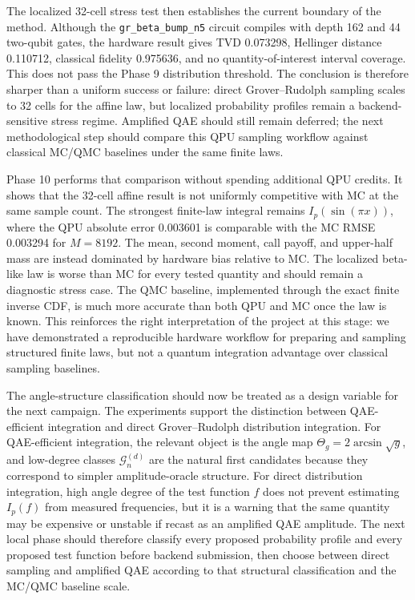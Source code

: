 The localized 32-cell stress test then establishes the current boundary of the
method. Although the \texttt{gr\_beta\_bump\_n5} circuit compiles with depth 162
and 44 two-qubit gates, the hardware result gives TVD 0.073298, Hellinger
distance 0.110712, classical fidelity 0.975636, and no quantity-of-interest
interval coverage. This does not pass the Phase 9 distribution threshold. The
conclusion is therefore sharper than a uniform success or failure: direct
Grover--Rudolph sampling scales to 32 cells for the affine law, but localized
probability profiles remain a backend-sensitive stress regime. Amplified QAE
should still remain deferred; the next methodological step should compare this
QPU sampling workflow against classical MC/QMC baselines under the same finite
laws.

Phase 10 performs that comparison without spending additional QPU credits. It
shows that the 32-cell affine result is not uniformly competitive with MC at
the same sample count. The strongest finite-law integral remains
\(I_p(\sin(\pi x))\), where the QPU absolute error 0.003601 is comparable with
the MC RMSE 0.003294 for \(M=8192\). The mean, second moment, call payoff, and
upper-half mass are instead dominated by hardware bias relative to MC. The
localized beta-like law is worse than MC for every tested quantity and should
remain a diagnostic stress case. The QMC baseline, implemented through the exact
finite inverse CDF, is much more accurate than both QPU and MC once the law is
known. This reinforces the right interpretation of the project at this stage:
we have demonstrated a reproducible hardware workflow for preparing and
sampling structured finite laws, but not a quantum integration advantage over
classical sampling baselines.

The angle-structure classification should now be treated as a design variable
for the next campaign. The experiments support the distinction between
QAE-efficient integration and direct Grover--Rudolph distribution integration.
For QAE-efficient integration, the relevant object is the angle map
\(\Theta_g=2\arcsin\sqrt{g}\), and low-degree classes
\(\mathcal{G}^{(d)}_n\) are the natural first candidates because they correspond
to simpler amplitude-oracle structure. For direct distribution integration,
high angle degree of the test function \(f\) does not prevent estimating
\(I_p(f)\) from measured frequencies, but it is a warning that the same
quantity may be expensive or unstable if recast as an amplified QAE amplitude.
The next local phase should therefore classify every proposed probability
profile and every proposed test function before backend submission, then choose
between direct sampling and amplified QAE according to that structural
classification and the MC/QMC baseline scale.

